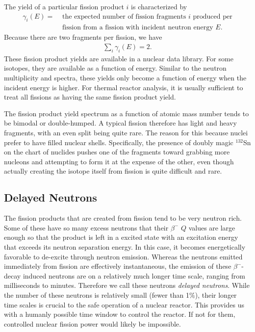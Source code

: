 The yield of a particular fission product $i$ is characterized by
\begin{align}
  \gamma_i(E) = 	&\text{ the expected number of fission fragments $i$ produced per} \nonumber \\
  					&\text{ fission from a fission with incident neutron energy $E$.} \nonumber
\end{align}
Because there are two fragments per fission, we have
\begin{align}
  \sum_i \gamma_i(E) = 2. \nonumber
\end{align}
These fission product yields are available in a nuclear data library. For some isotopes, they are available as a function of energy. Similar to the neutron multiplicity and spectra, these yields only become a function of energy when the incident energy is higher. For thermal reactor analysis, it is usually sufficient to treat all fissions as having the same fission product yield.

The fission product yield spectrum as a function of atomic mass number tends to be bimodal or double-humped. A typical fission therefore has light and heavy fragments, with an even split being quite rare. The reason for this because nuclei prefer to have filled nuclear shells. Specifically, the presence of doubly magic $^{132}$Sn on the chart of nuclides pushes one of the fragments toward grabbing more nucleons and attempting to form it at the expense of the other, even though actually creating the isotope itself from fission is quite difficult and rare.

\subsection{Delayed Neutrons} \label{Sec:nuclearData_delayedNeutrons}

The fission products that are created from fission tend to be very neutron rich. Some of these have so many excess neutrons that their $\beta^-$ $Q$ values are large enough so that the product is left in a excited state with an excitation energy that exceeds its neutron separation energy. In this case, it becomes energetically favorable to de-excite through neutron emission. Whereas the neutrons emitted immediately from fission are effectively instantaneous, the emission of these $\beta^-$-decay induced neutrons are on a relatively much longer time scale, ranging from milliseconds to minutes. Therefore we call these neutrons \emph{delayed neutrons}. While the number of these neutrons is relatively small (fewer than 1\%), their longer time scales is crucial to the safe operation of a nuclear reactor. This provides us with a humanly possible time window to control the reactor. If not for them, controlled nuclear fission power would likely be impossible.

